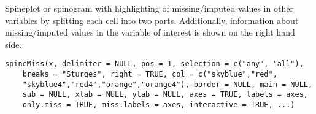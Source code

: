%
\begin{Description}\relax
Spineplot or spinogram with highlighting of missing/imputed values in 
other variables by splitting each cell into two parts.  Additionally, 
information about missing/imputed values in the variable of interest is shown 
on the right hand side.
\end{Description}
%
\begin{Usage}
\begin{verbatim}
spineMiss(x, delimiter = NULL, pos = 1, selection = c("any", "all"),
    breaks = "Sturges", right = TRUE, col = c("skyblue","red",
    "skyblue4","red4","orange","orange4"), border = NULL, main = NULL,
    sub = NULL, xlab = NULL, ylab = NULL, axes = TRUE, labels = axes,
    only.miss = TRUE, miss.labels = axes, interactive = TRUE, ...)
\end{verbatim}
\end{Usage}
%
